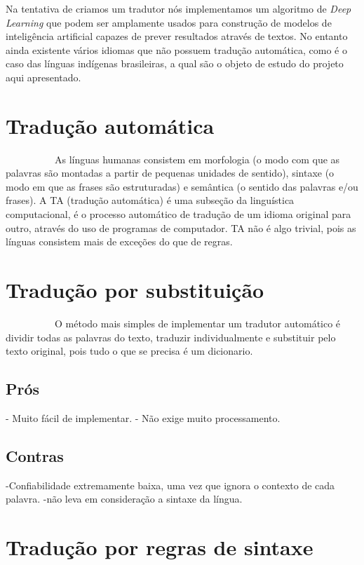 \documentclass[12pt]{article}
\begin{document}
Na tentativa de criamos um tradutor nós implementamos um algoritmo de \textit{Deep Learning} que podem ser amplamente usados para construção de modelos de inteligência artificial capazes de prever resultados através de textos. No entanto ainda existente vários idiomas que não possuem tradução automática, como é o caso das línguas indígenas brasileiras, a qual são o objeto de estudo do projeto aqui apresentado.

\section{Tradução automática}
~~~~~~~~~~As línguas humanas consistem em morfologia (o modo com que as palavras são montadas a partir de pequenas unidades de sentido), sintaxe (o modo em que as frases são estruturadas) e semântica (o sentido das palavras e/ou frases).
A TA (tradução automática) é uma subseção da linguística computacional, é o processo automático de tradução de um idioma original para outro, através do uso de programas de computador. TA não é algo trivial, pois as línguas consistem mais de exceções do que de regras.

\section{Tradução por substituição}

~~~~~~~~~~O método mais simples de implementar um tradutor automático é dividir todas as palavras do texto, traduzir individualmente e substituir pelo texto original, pois tudo o que se precisa é um dicionario.

\subsection{Prós}

- Muito fácil de implementar.\newline
- Não exige muito processamento.

\subsection{Contras}

-Confiabilidade extremamente baixa, uma vez que ignora o contexto de cada palavra.\newline
-não leva em consideração a sintaxe da língua.

\section{Tradução por regras de sintaxe}
\end{document}
